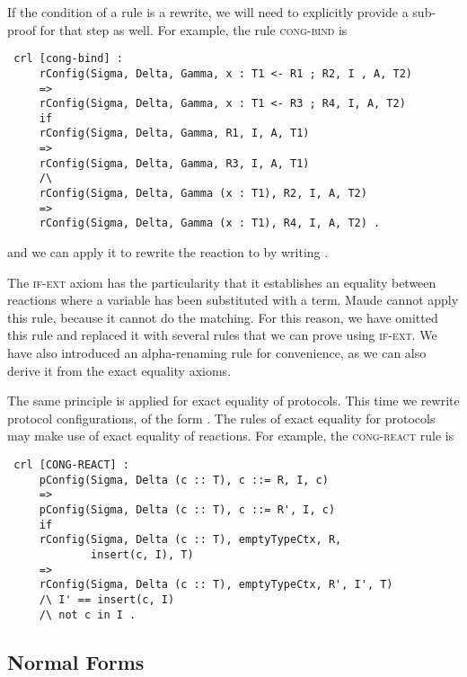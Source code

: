 If the condition of a rule is a rewrite, we will need to explicitly
provide a sub-proof for that step as well.
For example, the rule \textsc{cong-bind} is
\begin{lstlisting}
 crl [cong-bind] :
     rConfig(Sigma, Delta, Gamma, x : T1 <- R1 ; R2, I , A, T2) 
     => 
     rConfig(Sigma, Delta, Gamma, x : T1 <- R3 ; R4, I, A, T2) 
     if
     rConfig(Sigma, Delta, Gamma, R1, I, A, T1)  
     => 
     rConfig(Sigma, Delta, Gamma, R3, I, A, T1) 
     /\
     rConfig(Sigma, Delta, Gamma (x : T1), R2, I, A, T2)
     => 
     rConfig(Sigma, Delta, Gamma (x : T1), R4, I, A, T2) .
\end{lstlisting}
\noindent and we can apply it to rewrite the reaction
to
by writing
.

The \textsc{if-ext} axiom has the particularity that 
it establishes an equality between reactions 
where a variable has been substituted with a term.
Maude cannot apply this rule, because it cannot do the matching.
For this reason, we have omitted this rule and replaced it with
several rules that we can prove using \textsc{if-ext}. We have also
introduced an alpha-renaming rule for convenience, as we can also derive it
from the exact equality axioms.

The same principle is applied for exact equality of protocols.
This time we rewrite protocol configurations, of the form
.
The rules of exact equality for protocols may make use of
exact equality of reactions. For example, the \textsc{cong-react} rule
is
\begin{lstlisting}
 crl [CONG-REACT] : 
     pConfig(Sigma, Delta (c :: T), c ::= R, I, c) 
     =>
     pConfig(Sigma, Delta (c :: T), c ::= R', I, c)
     if
     rConfig(Sigma, Delta (c :: T), emptyTypeCtx, R, 
             insert(c, I), T)
     =>
     rConfig(Sigma, Delta (c :: T), emptyTypeCtx, R', I', T) 
     /\ I' == insert(c, I)
     /\ not c in I .
\end{lstlisting}

\subsection{Normal Forms}

